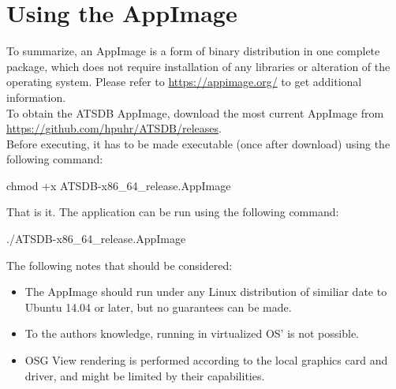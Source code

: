 \section{Using the AppImage}

To summarize, an AppImage is a form of binary distribution in one complete package, which does not require installation of any libraries or alteration of the operating system. Please refer to \url{https://appimage.org/} to get additional information. \\

To obtain the ATSDB AppImage, download the most current AppImage from \url{https://github.com/hpuhr/ATSDB/releases}. \\

Before executing, it has to be made executable (once after download) using the following command:
\begin{cverbatim}
chmod +x ATSDB-x86_64_release.AppImage
\end{cverbatim}

That is it. The application can be run using the following command:
\begin{cverbatim}
./ATSDB-x86_64_release.AppImage
\end{cverbatim}

The following notes that should be considered:

\begin{itemize}  
\item The AppImage should run under any Linux distribution of similiar date to Ubuntu 14.04 or later, but no guarantees can be made.
\item To the authors knowledge, running in virtualized OS' is not possible.
\item OSG View rendering is performed according to the local graphics card and driver, and might be limited by their capabilities.
\end{itemize} 
